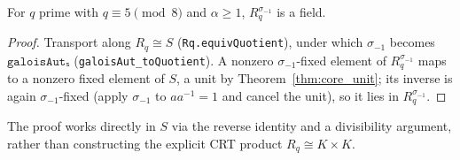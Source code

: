 \begin{theorem}\label{thm:conjFixedSubring_isField}
\leanok
{}
For $q$ prime with $q \equiv 5 \pmod 8$ and $\alpha \ge 1$, $R_q^{\sigma_{-1}}$ is a field.
\end{theorem}

\begin{proof}
\leanok{}
Transport along $R_q \cong S$ (\texttt{Rq.equivQuotient}), under which $\sigma_{-1}$ becomes
$\texttt{galoisAutₛ}$ (\texttt{galoisAut\_toQuotient}). A nonzero $\sigma_{-1}$-fixed element of
$R_q^{\sigma_{-1}}$ maps to a nonzero fixed element of $S$, a unit by
Theorem~\ref{thm:core_unit}; its inverse is again $\sigma_{-1}$-fixed (apply $\sigma_{-1}$ to
$a a^{-1} = 1$ and cancel the unit), so it lies in $R_q^{\sigma_{-1}}$.
\end{proof}

The proof works directly in $S$ via the reverse identity and a divisibility argument, rather than
constructing the explicit CRT product $R_q \cong K\times K$.
